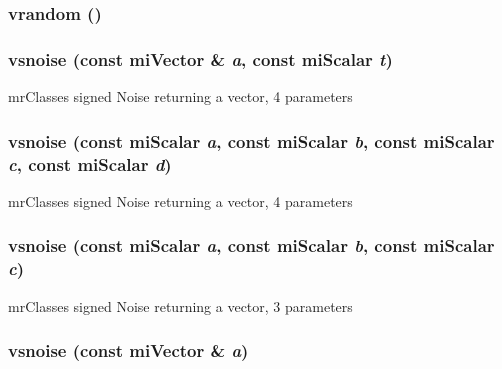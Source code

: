 \subsubsection{ vrandom ()\hspace{0.3cm}{\tt  [inline]}}\label{namespacersl_a43}


\subsubsection{ vsnoise (const mi\-Vector \& {\em a}, const mi\-Scalar {\em t})\hspace{0.3cm}{\tt  [inline]}}\label{namespacersl_a69}


mr\-Classes signed Noise returning a vector, 4 parameters 

\subsubsection{ vsnoise (const mi\-Scalar {\em a}, const mi\-Scalar {\em b}, const mi\-Scalar {\em c}, const mi\-Scalar {\em d})\hspace{0.3cm}{\tt  [inline]}}\label{namespacersl_a68}


mr\-Classes signed Noise returning a vector, 4 parameters 

\subsubsection{ vsnoise (const mi\-Scalar {\em a}, const mi\-Scalar {\em b}, const mi\-Scalar {\em c})\hspace{0.3cm}{\tt  [inline]}}\label{namespacersl_a67}


mr\-Classes signed Noise returning a vector, 3 parameters 

\subsubsection{ vsnoise (const mi\-Vector \& {\em a})\hspace{0.3cm}{\tt  [inline]}}\label{namespacersl_a66}


